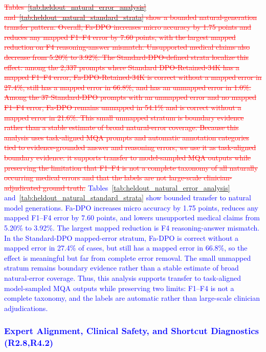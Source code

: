 \documentclass[a4paper,fleqn,doubleblind]{cas-sc}
\DeclareRobustCommand{\deleted}[1]{\textcolor{red}{\sout{#1}}}
\DeclareRobustCommand{\added}[1]{\textcolor{blue}{#1}}
\DeclareRobustCommand{\revtag}[1]{\textcolor{blue}{\scriptsize\,(\textbf{#1})}}
\begin{document}
\deleted{Tables~\ref{tab:heldout_natural_error_analysis} and~\ref{tab:heldout_natural_standard_strata} show a bounded natural-generation transfer pattern. Overall, Fa-DPO increases micro accuracy by 1.75 points and reduces any mapped F1--F4 error by 7.60 points, with the largest mapped reduction on F4 reasoning-answer mismatch. Unsupported medical claims also decrease from 5.20\% to 3.92\%. The Standard-DPO-defined strata localize this effect: among the 2,337 prompts where Standard DPO-Retained-34K has a mapped F1--F4 error, Fa-DPO-Retained-34K is correct without a mapped error in 27.4\%, still has a mapped error in 66.8\%, and has an unmapped error in 1.0\%. Among the 37 Standard-DPO prompts with an unmapped error and no mapped F1--F4 error, Fa-DPO remains unmapped in 54.1\% and is correct without a mapped error in 21.6\%. This small unmapped stratum is boundary evidence rather than a stable estimate of broad natural-error coverage. Because this analysis uses task-aligned MQA prompts and automatic annotation categories tied to evidence-grounded answer and reasoning errors, we use it as task-aligned boundary evidence: it supports transfer to model-sampled MQA outputs while preserving the limitation that F1--F4 is not a complete taxonomy of all naturally occurring medical errors and that the labels are not large-scale clinician-adjudicated ground truth.}
\added{Tables~\ref{tab:heldout_natural_error_analysis} and~\ref{tab:heldout_natural_standard_strata} show bounded transfer to natural model generations. Fa-DPO increases micro accuracy by 1.75 points, reduces any mapped F1--F4 error by 7.60 points, and lowers unsupported medical claims from 5.20\% to 3.92\%. The largest mapped reduction is F4 reasoning-answer mismatch. In the Standard-DPO mapped-error stratum, Fa-DPO is correct without a mapped error in 27.4\% of cases, but still has a mapped error in 66.8\%, so the effect is meaningful but far from complete error removal. The small unmapped stratum remains boundary evidence rather than a stable estimate of broad natural-error coverage. Thus, this analysis supports transfer to task-aligned model-sampled MQA outputs while preserving two limits: F1--F4 is not a complete taxonomy, and the labels are automatic rather than large-scale clinician adjudications.}

\subsubsection{\added{Expert Alignment, Clinical Safety, and Shortcut Diagnostics}\revtag{R2.8,R4.2}}
\label{subsec:human_alignment}
\label{subsec:harm_severity_audit}
\label{subsec:answer_shortcut_diagnostic}
\end{document}
